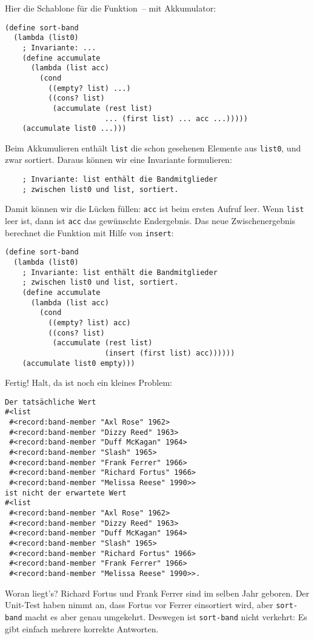%
Hier die Schablone für die Funktion~-- mit Akkumulator:
%
\begin{lstlisting}
(define sort-band
  (lambda (list0)
    ; Invariante: ...
    (define accumulate     
      (lambda (list acc)
        (cond
          ((empty? list) ...)
          ((cons? list)
           (accumulate (rest list)
                       ... (first list) ... acc ...)))))
    (accumulate list0 ...)))
\end{lstlisting}
%
Beim Akkumulieren enthält \lstinline{list} die schon gesehenen
Elemente aus \lstinline{list0}, und zwar sortiert.  Daraus können wir
eine Invariante formulieren:
%
\begin{lstlisting}
    ; Invariante: list enthält die Bandmitglieder
    ; zwischen list0 und list, sortiert.
\end{lstlisting}
%
Damit können wir die Lücken füllen: \lstinline{acc} ist beim ersten
Aufruf leer.  Wenn \lstinline{list} leer ist, dann ist \lstinline{acc}
das gewünschte Endergebnis.  Das neue Zwischenergebnis berechnet die
Funktion mit Hilfe von \lstinline{insert}:
%
\begin{lstlisting}
(define sort-band
  (lambda (list0)
    ; Invariante: list enthält die Bandmitglieder
    ; zwischen list0 und list, sortiert.
    (define accumulate     
      (lambda (list acc)
        (cond
          ((empty? list) acc)
          ((cons? list)
           (accumulate (rest list)
                       (insert (first list) acc))))))
    (accumulate list0 empty)))
\end{lstlisting}
%
Fertig! Halt, da ist noch ein kleines Problem:
%
\begin{verbatim}
Der tatsächliche Wert 
#<list
 #<record:band-member "Axl Rose" 1962>
 #<record:band-member "Dizzy Reed" 1963>
 #<record:band-member "Duff McKagan" 1964>
 #<record:band-member "Slash" 1965>
 #<record:band-member "Frank Ferrer" 1966>
 #<record:band-member "Richard Fortus" 1966>
 #<record:band-member "Melissa Reese" 1990>>
ist nicht der erwartete Wert 
#<list
 #<record:band-member "Axl Rose" 1962>
 #<record:band-member "Dizzy Reed" 1963>
 #<record:band-member "Duff McKagan" 1964>
 #<record:band-member "Slash" 1965>
 #<record:band-member "Richard Fortus" 1966>
 #<record:band-member "Frank Ferrer" 1966>
 #<record:band-member "Melissa Reese" 1990>>.
\end{verbatim}
%
Woran liegt's?  Richard Fortus und Frank Ferrer sind im selben Jahr
geboren.  Der Unit-Test haben nimmt an, dass Fortus vor Ferrer
einsortiert wird, aber \lstinline{sort-band} macht es aber genau
umgekehrt.  Deswegen ist \lstinline{sort-band} nicht verkehrt: Es gibt
einfach mehrere korrekte Antworten.

